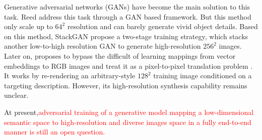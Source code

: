 \documentclass[10pt,twocolumn,letterpaper]{article}
\begin{document}
Generative adversarial networks (GANs) have become the main solution to this task. 
Reed \etal \cite{reed2016generative} address this task through a GAN based framework. But this method only scale up to $64^2$ resolution and can barely generate vivid object details.
Based on this method, StackGAN  \cite{han2017stackgan} propose a two-stage training strategy, which stacks another low-to-high resolution GAN to generate high-resolution $256^2$ images. Later on, \cite{dong2017semantic} proposes to bypass the difficult of learning mappings from vector embeddings to RGB images and treat it as a pixel-to-pixel translation problem \cite{isola2016image}. It works by re-rendering an arbitrary-style $128^2$ training  image conditioned on a targeting description. However, its high-resolution synthesis capability remains unclear. 

At present,\textcolor{red}{adversarial training of a generative model mapping a low-dimensional semantic space to  high-resolution and diverse images space in a fully end-to-end manner is still an open question. } 
\end{document}

